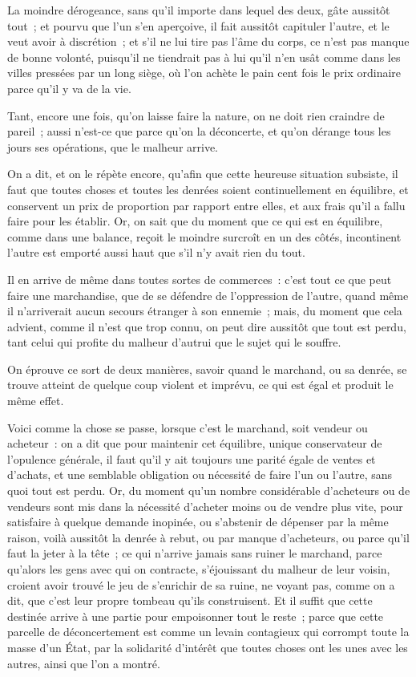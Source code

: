 \documentclass[french,twoside]{book} %
\begin{document}
La moindre dérogeance, sans qu’il importe dans lequel des deux, gâte aussitôt tout ; et pourvu que l’un s’en aperçoive, il fait aussitôt capituler l’autre, et le veut avoir à discrétion ; et s’il ne lui tire pas l’âme du corps, ce n’est pas manque de bonne volonté, puisqu’il ne tiendrait pas à lui qu’il n’en usât comme dans les villes pressées par un long siège, où l’on achète le pain cent fois le prix ordinaire parce qu’il y va de la vie.\par
Tant, encore une fois, qu’on laisse faire la nature, on ne doit rien craindre de pareil ; aussi n’est-ce que parce qu’on la déconcerte, et qu’on dérange tous les jours ses opérations, que le malheur arrive.\par
On a dit, et on le répète encore, qu’afin que cette heureuse situation subsiste, il faut que toutes choses et toutes les denrées soient continuellement en équilibre, et conservent un prix de proportion par rapport entre elles, et aux frais qu’il a fallu faire pour les établir. Or, on sait que du moment que ce qui est en équilibre, comme dans une balance, reçoit le moindre surcroît en un des côtés, incontinent l’autre est emporté aussi haut que s’il n’y avait rien du tout.\par
Il en arrive de même dans toutes sortes de commerces : c’est tout ce que peut faire une marchandise, que de se défendre de l’oppression de l’autre, quand même il n’arriverait aucun secours étranger à son ennemie ; mais, du moment que cela advient, comme il n’est que trop connu, on peut dire aussitôt que tout est perdu, tant celui qui profite du malheur d’autrui que le sujet qui le souffre.\par
On éprouve ce sort de deux manières, savoir quand le marchand, ou sa denrée, se trouve atteint de quelque coup violent et imprévu, ce qui est égal et produit le même effet.\par
Voici comme la chose se passe, lorsque c’est le marchand, soit vendeur ou acheteur : on a dit que pour maintenir cet équilibre, unique conservateur de l’opulence générale, il faut qu’il y ait toujours une parité égale de ventes et d’achats, et une semblable obligation ou nécessité de faire l’un ou l’autre, sans quoi tout est perdu. Or, du moment qu’un nombre considérable d’acheteurs ou de vendeurs sont mis dans la nécessité d’acheter moins ou de vendre plus vite, pour satisfaire à quelque demande inopinée, ou s’abstenir de dépenser par la même raison, voilà aussitôt la denrée à rebut, ou par manque d’acheteurs, ou parce qu’il faut la jeter à la tête ; ce qui n’arrive jamais sans ruiner le marchand, parce qu’alors les gens avec qui on contracte, s’éjouissant du malheur de leur voisin, croient avoir trouvé le jeu de s’enrichir de sa ruine, ne voyant pas, comme on a dit, que c’est leur propre tombeau qu’ils construisent. Et il suffit que cette destinée arrive à une partie pour empoisonner tout le reste ; parce que cette parcelle de déconcertement est comme un levain contagieux qui corrompt toute la masse d’un État, par la solidarité d’intérêt que toutes choses ont les unes avec les autres, ainsi que l’on a montré.\par
\end{document}
